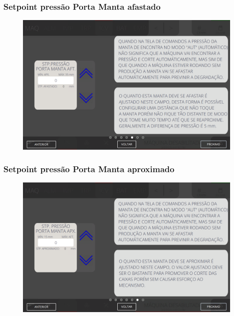 \newpage
\thispagestyle{fancy}
\vspace*{40 pt}
\subsubsection{\small{Setpoint pressão Porta Manta afastado}} \label{sec:telaAjustesCorteEVincoSetpointPressaoPortaMantaAfastado}
\vspace*{\fill}
\begin{figure}[h]
    \centering
    \includegraphics[width=576 px,height=360 px]{src/imagesICV/06-dryCutter/settings/e-5.png}
\end{figure}
\vspace*{\fill}

\newpage
\thispagestyle{fancy}
\vspace*{40 pt}
\subsubsection{\small{Setpoint pressão Porta Manta aproximado}} \label{sec:telaAjustesCorteEVincoSetpointPressaoPortaMantaAproximado}
\vspace*{\fill}
\begin{figure}[h]
    \centering
    \includegraphics[width=576 px,height=360 px]{src/imagesICV/06-dryCutter/settings/e-6.png}
\end{figure}
\vspace*{\fill}

